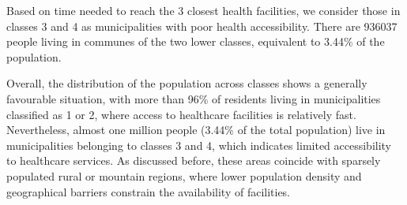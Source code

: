 Based on time needed to reach the 3 closest health facilities, we consider those in classes 3 and 4 as municipalities with poor health accessibility.
There are 936037 people living in communes of the two lower classes, equivalent to 3.44\% of the population.

Overall, the distribution of the population across classes shows a generally favourable situation, with more than 96\% of residents living in municipalities classified as 1 or 2, where access to healthcare facilities is relatively fast.
Nevertheless, almost one million people (3.44\% of the total population) live in municipalities belonging to classes 3 and 4, which indicates limited accessibility to healthcare services. 
As discussed before, these areas coincide with sparsely populated rural or mountain regions, where lower population density and geographical barriers constrain the availability of facilities.


